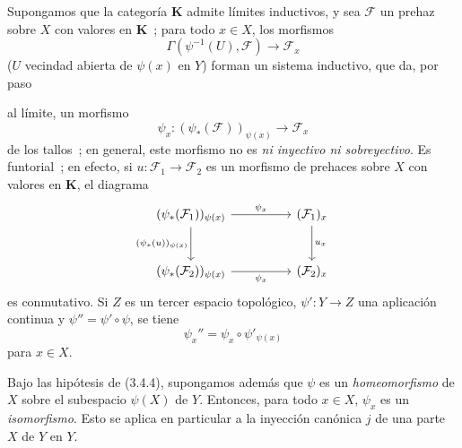 \begin{env}[3.4.4]
\label{0.3.4.4-fr}
Supongamos que la categoría $\boldsymbol{K}$ admite límites inductivos, y sea
$\mathcal{F}$ un prehaz sobre $X$ con valores en $\boldsymbol{K}$~; para todo
$x\in X$, los morfismos
\[
  \Gamma(\psi^{-1}(U),\mathcal{F})\to\mathcal{F}_x
\]
($U$ vecindad abierta de $\psi(x)$ en $Y$) forman un sistema inductivo, que
da, por paso


al límite, un morfismo
\[
  \psi_x:(\psi_*(\mathcal{F}))_{\psi(x)}\to\mathcal{F}_x
\]
de los tallos~; en general, este morfismo no es \emph{ni inyectivo ni sobreyectivo}.
Es funtorial~; en efecto, si
$u:\mathcal{F}_1\to\mathcal{F}_2$ es un morfismo de prehaces sobre $X$ con
valores en $\boldsymbol{K}$, el diagrama
\[
\begin{tikzcd}[column sep=huge,row sep=large]
(\psi_*(\mathcal{F}_1))_{\psi(x)}
  \arrow[r,"\psi_x"] \arrow[d,"{(\psi_*(u))_{\psi(x)}}"']
  & (\mathcal{F}_1)_x \arrow[d,"u_x"] \\
(\psi_*(\mathcal{F}_2))_{\psi(x)}
  \arrow[r,"\psi_x"']
  & (\mathcal{F}_2)_x
\end{tikzcd}
\]
es conmutativo. Si $Z$ es un tercer espacio topológico,
$\psi':Y\to Z$ una aplicación continua y $\psi''=\psi'\circ\psi$, se tiene
\[
  \psi_x''=\psi_x\circ\psi'_{\psi(x)}
\]
para $x\in X$.
\end{env}

\begin{env}[3.4.5]
\label{0.3.4.5-fr}
Bajo las hipótesis de (3.4.4), supongamos además que $\psi$ es un
\emph{homeomorfismo} de $X$ sobre el subespacio $\psi(X)$ de $Y$. Entonces, para
todo $x\in X$, $\psi_x$ es un \emph{isomorfismo}. Esto se aplica en
particular a la inyección canónica $j$ de una parte $X$ de $Y$ en $Y$.
\end{env}
